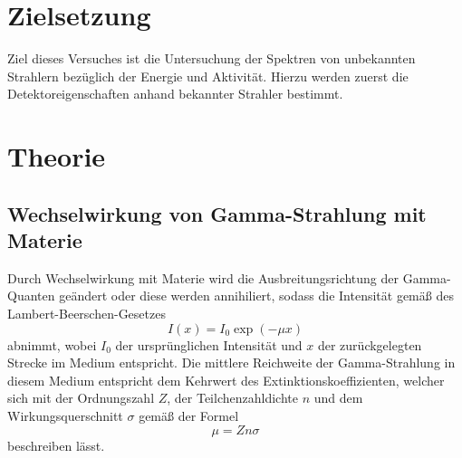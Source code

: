 



\maketitle
\thispagestyle{empty}
\tableofcontents
\newpage

\section{Zielsetzung}
Ziel dieses Versuches ist die Untersuchung der Spektren von unbekannten Strahlern bezüglich der Energie und Aktivität.
Hierzu werden zuerst die Detektoreigenschaften anhand bekannter Strahler bestimmt. 

\section{Theorie}
\subsection{Wechselwirkung von Gamma-Strahlung mit Materie}
Durch Wechselwirkung mit Materie wird die Ausbreitungsrichtung der Gamma-Quanten geändert oder diese werden annihiliert, sodass die Intensität gemäß des Lambert-Beerschen-Gesetzes
\begin{equation}
I(x) = I_0 \exp(-\mu x)
\end{equation}
abnimmt,
wobei $I_0$ der ursprünglichen Intensität und $x$ der zurückgelegten Strecke im Medium entspricht.
Die mittlere Reichweite der Gamma-Strahlung in diesem Medium entspricht dem Kehrwert des Extinktionskoeffizienten, welcher sich mit der Ordnungszahl $Z$, der Teilchenzahldichte $n$ und dem Wirkungsquerschnitt $\sigma$ gemäß der Formel
\begin{equation}\label{eq:mu}
\mu = Zn\sigma
\end{equation}
beschreiben lässt.

